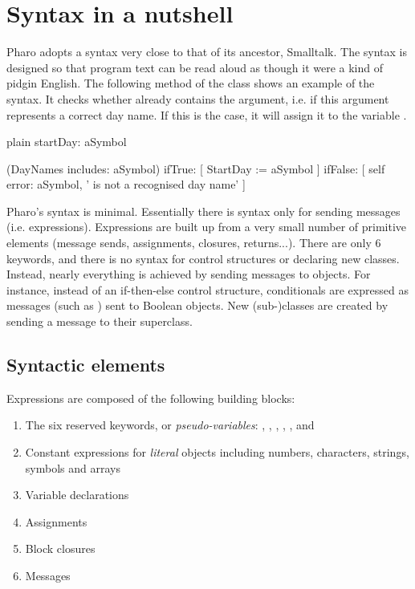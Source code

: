 \documentclass[10pt,twoside,english]{_support/latex/sbabook/sbabook}
\begin{document}
\frontmatter
\pagestyle{plain}

\tableofcontents*
\clearpage\listoffigures

\mainmatter

\chapter{Syntax in a nutshell}\label{cha:syntax}
Pharo adopts a syntax very close to that of its ancestor, Smalltalk. The syntax
is designed so that program text can be read aloud as though it were a kind of
pidgin English. The following method of the class  shows an example of
the syntax. It checks whether  already contains the argument, i.e.
if this argument represents a correct day name. If this is the case, it
will assign it to the variable .

\begin{displaycode}{plain}
startDay: aSymbol

   (DayNames includes: aSymbol)
      ifTrue: [ StartDay := aSymbol ]
      ifFalse: [ self error: aSymbol, ' is not a recognised day name' ]
\end{displaycode}

Pharo's syntax is minimal. Essentially there is syntax only for sending messages
(i.e. expressions). Expressions are built up from a very small number of
primitive elements (message sends, assignments, closures, returns...). There are
only 6 keywords, and there is no syntax for control structures or declaring new
classes. Instead, nearly everything is achieved by sending messages to objects.
For instance, instead of an if-then-else control structure, conditionals are
expressed as messages (such as ) sent to Boolean objects. New
(sub-)classes are created by sending a message to their superclass.
\section{Syntactic elements}
Expressions are composed of the following building blocks:

\begin{enumerate}
\item The six reserved keywords, or \textit{pseudo-variables}: , , , , , and 
\item Constant expressions for \textit{literal} objects including numbers, characters, strings, symbols and arrays
\item Variable declarations
\item Assignments
\item Block closures
\item Messages
\end{enumerate}
\end{document}
